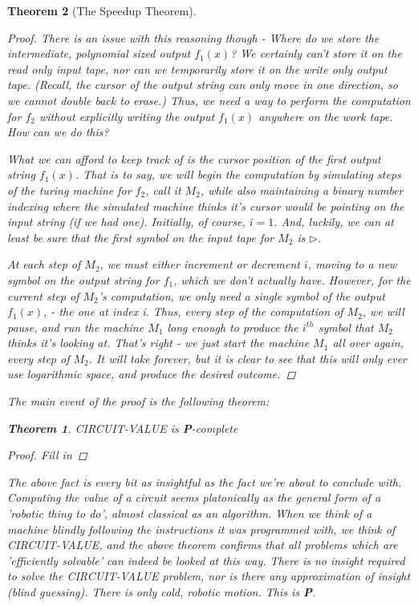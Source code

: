 \documentclass{article}
\theoremstyle{definition}
\theoremstyle{plain}
\theoremstyle{theorem}
\newtheorem{theorem}{Theorem}[section]
\begin{document}
\begin{theorem}[The Speedup Theorem]
\begin{proof}
    \par There is an issue with this reasoning though - Where do we store the intermediate, polynomial sized output $f_1(x)$? We certainly can't store it on the read only input tape, nor can we temporarily store it on the write only output tape. (Recall, the cursor of the output string can only move in one direction, so we cannot double back to erase.) Thus, we need a way to perform the computation for $f_2$ without explicitly writing the output $f_1(x)$ anywhere on the work tape. How can we do this?
    \par What we \textit{can} afford to keep track of is the cursor position of the first output string $f_1(x)$. That is to say, we will begin the computation by simulating steps of the turing machine for $f_2$, call it $M_2$, while also maintaining a binary number indexing where the simulated machine \textit{thinks} it's cursor would be pointing on the input string (if we had one). Initially, of course, $i=1$. And, luckily, we can at least be sure that the first symbol on the input tape for $M_2$ is $\triangleright$.
    \par At each step of $M_2$, we must either increment or decrement $i$, moving to a new symbol on the output string for $f_1$, which we don't actually have. However, \textit{for the current step of $M_2$'s computation}, we only need a single symbol of the output $f_1(x)$, - the one at index i. Thus, every step of the computation of $M_2$, we will pause, and run the machine $M_1$ long enough to produce the $i^{th}$ symbol that $M_2$ thinks it's looking at. That's right - we just start the machine $M_1$ all over again, every step of $M_2$. It will take forever, but it is clear to see that this will only ever use logarithmic space, and produce the desired outcome.
\end{proof}
The main event of the proof is the following theorem:
\begin{theorem}
    CIRCUIT-VALUE is \textbf{P}-complete
\end{theorem}
\begin{proof}
Fill in
\end{proof}
The above fact is every bit as insightful as the fact we're about to conclude with. Computing the value of a circuit seems platonically as the general form of a 'robotic thing to do', almost classical as an algorithm. When we think of a machine blindly following the instructions it was programmed with, we think of CIRCUIT-VALUE, and the above theorem confirms that all problems which are 'efficiently solvable' can indeed be looked at this way. There is no insight required to solve the CIRCUIT-VALUE problem, nor is there any approximation of insight (blind guessing). There is only cold, robotic motion. This is \textbf{P}. 

\end{theorem}
\end{document}
